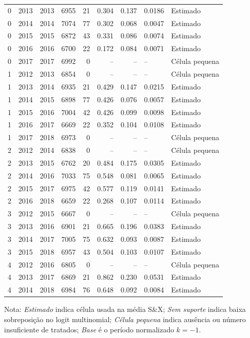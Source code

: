 \begin{longtable}{rrrrrrrll}
0 & 2013 & 2013 & 6955 & 21 & 0.304 & 0.137 & 0.0186 & Estimado \\
0 & 2014 & 2014 & 7074 & 77 & 0.302 & 0.068 & 0.0047 & Estimado \\
0 & 2015 & 2015 & 6872 & 43 & 0.331 & 0.086 & 0.0074 & Estimado \\
0 & 2016 & 2016 & 6700 & 22 & 0.172 & 0.084 & 0.0071 & Estimado \\
0 & 2017 & 2017 & 6992 & 0 & -- & -- & -- & Célula pequena \\
1 & 2012 & 2013 & 6854 & 0 & -- & -- & -- & Célula pequena \\
1 & 2013 & 2014 & 6935 & 21 & 0.429 & 0.147 & 0.0215 & Estimado \\
1 & 2014 & 2015 & 6898 & 77 & 0.426 & 0.076 & 0.0057 & Estimado \\
1 & 2015 & 2016 & 7004 & 42 & 0.426 & 0.099 & 0.0098 & Estimado \\
1 & 2016 & 2017 & 6669 & 22 & 0.352 & 0.104 & 0.0108 & Estimado \\
1 & 2017 & 2018 & 6973 & 0 & -- & -- & -- & Célula pequena \\
2 & 2012 & 2014 & 6838 & 0 & -- & -- & -- & Célula pequena \\
2 & 2013 & 2015 & 6762 & 20 & 0.484 & 0.175 & 0.0305 & Estimado \\
2 & 2014 & 2016 & 7033 & 75 & 0.548 & 0.081 & 0.0065 & Estimado \\
2 & 2015 & 2017 & 6975 & 42 & 0.577 & 0.119 & 0.0141 & Estimado \\
2 & 2016 & 2018 & 6659 & 22 & 0.268 & 0.107 & 0.0114 & Estimado \\
3 & 2012 & 2015 & 6667 & 0 & -- & -- & -- & Célula pequena \\
3 & 2013 & 2016 & 6901 & 21 & 0.665 & 0.196 & 0.0383 & Estimado \\
3 & 2014 & 2017 & 7005 & 75 & 0.632 & 0.093 & 0.0087 & Estimado \\
3 & 2015 & 2018 & 6957 & 43 & 0.504 & 0.103 & 0.0107 & Estimado \\
4 & 2012 & 2016 & 6805 & 0 & -- & -- & -- & Célula pequena \\
4 & 2013 & 2017 & 6869 & 21 & 0.862 & 0.230 & 0.0531 & Estimado \\
4 & 2014 & 2018 & 6984 & 76 & 0.648 & 0.092 & 0.0084 & Estimado \\
\end{longtable}
\vspace{-0.35cm}
\noindent\footnotesize Nota: \textit{Estimado} indica célula usada na média S\&X; \textit{Sem suporte} indica baixa sobreposição no logit multinomial; \textit{Célula pequena} indica ausência ou número insuficiente de tratados; \textit{Base} é o período normalizado \(k=-1\).
\par\endgroup
